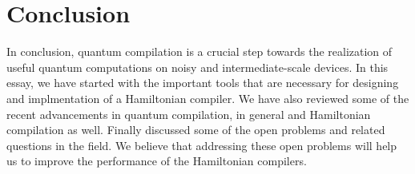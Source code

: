 \documentclass{report}
\begin{document}
\chapter{Conclusion}\label{chap:conclusion}

In conclusion, quantum compilation is a crucial step towards the realization of useful quantum computations on noisy and intermediate-scale devices. In this essay, we have started with the important tools that are necessary for designing and implmentation of a Hamiltonian compiler. We have also reviewed some of the recent advancements in quantum compilation, in general and Hamiltonian compilation as well. Finally discussed some of the open problems and related questions in the field. We believe that addressing these open problems will help us to improve the performance of the Hamiltonian compilers.

\printbibliography
\end{document}

